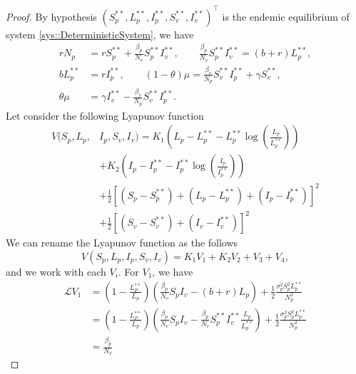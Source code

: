 \begin{proof}
	By hypothesis 
	$
		(S_p^{**}, L_p^{**}, I_p^{**}, S_v^{**}, I_v^{**}) ^ \top
	$ is the endemic equilibrium of system \autoref{sys::DeterministicSystem}, we have
	\begin{equation}
		\begin{aligned}
			rN_p
				&=
					rS_p^{**} + 
					\frac{\beta_p}{N_v}S_p^{**}I_v^{**},
					\quad\quad 
					\frac{\beta_p}{N_v}S_p^{**}I_v^{**} = (b+r)L_p^{**},
			\\
			bL_p^{**}
				&=
					rI_p^{**}, 
					\quad\quad 
					(1-\theta)
					\mu = \frac{\beta_v}{N_p}S_v^{**}I_p^{**}+\gamma S_v^{**},
			\\
					\theta\mu &= 
					\gamma I_v^{**} -\frac{\beta_v}{N_p}S_v^{**}I_p^{**}.
		\end{aligned}
	\end{equation}
	Let consider the following Lyapunov function
	\begin{align*}
		V(S_p,L_p,&I_p,S_v,I_v) = 
				K_1
				\left(
					L_p - L_p^{**} - 
					L_p^{**}\log
					\left(
						\frac{L_p}{L_p^{**}}
					\right)
				\right) 
				\\
				&+ 
				 K_2
				\left(
				 	I_p - I_p^{**} - I_p^{**} 
				 	\log
					\left(
						\frac{I_p}{I_p^{**}}
				 	\right)
				\right)
			\\
				&+
				\frac{1}{2}
				\left[
					(S_p - S_p^{**}) + 
					(L_p - L_p^{**}) + 
					(I_p - I_p^{**})
				\right]^2 
				\\
				&+ 
				\frac{1}{2}
				\left[
					(S_v - S_v^{**}) + 
					(I_v - I_v^{**})
				\right]^2		
	\end{align*}
	We can rename the Lyapunov function as the follows
	\begin{equation}
		V(S_p,L_p,I_p,S_v,I_v)= K_1V_1+K_2V_2+V_3+V_4,
	\end{equation}
%
	and we work with each $V_i$. For $V_1$, we have
	\begin{align*}
		\mathcal{L} V_1 
			&= 
				\left(
					1 - 
					\frac{L_P^{**}}{L_p}
				\right)
				\left(
					\frac{\beta_p}{N_v}S_pI_v - 
					(b+r) L_p
				\right) + 
				\frac{1}{2}
				\frac{\sigma_p^2S_p^2L_p^{**}}{N_p^2}
			\\
			&=
				\left(
					1 - \frac{L_P^{**}}{L_p}
				\right)
				\left(
					\frac{\beta_p}{N_v} S_pI_v - 
					\frac{\beta_p}{N_v} S_p ^{**} I_v ^{**} 
					\frac{L_p}{L_p^{**}}
				\right) + 
				\frac{1}{2}
				\frac{\sigma_p^2S_p^2L_p^{**}}{N_p^2}
			\\
			&=
				\frac{\beta_p}{N_v}

\end{align*}
\end{proof}
